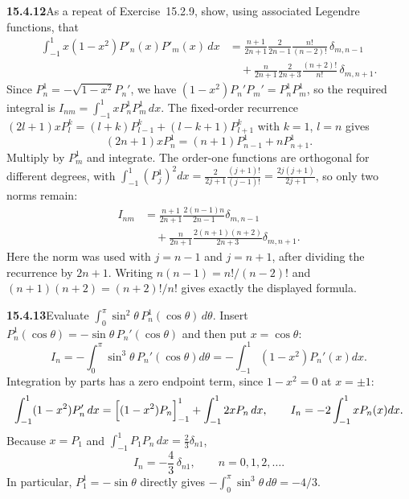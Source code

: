 \par\bigskip
\noindent\textbf{15.4.12}\quad As a repeat of Exercise~15.2.9, show,
using associated Legendre functions, that 
\begin{align*}
\int_{-1}^{1}x(1-x^{2})P'_{n}(x)P'_{m}(x)\,dx
&=\frac{n+1}{2n+1}\frac{2}{2n-1}\frac{n!}{(n-2)!}\,\delta_{m,n-1}\\
&\quad+\frac{n}{2n+1}\frac{2}{2n+3}\frac{(n+2)!}{n!}\,\delta_{m,n+1}.
\end{align*}
\solution
Since $P_n^1=-\sqrt{1-x^2}P_n'$, we have
$(1-x^2)P_n'P_m'=P_n^1P_m^1$, so the required integral is
$I_{nm}=\int_{-1}^1xP_n^1P_m^1\,dx$.
The fixed-order recurrence
$(2l+1)xP_l^k=(l+k)P_{l-1}^k+(l-k+1)P_{l+1}^k$ with $k=1$, $l=n$ gives
\[
(2n+1)xP_n^1=(n+1)P_{n-1}^1+nP_{n+1}^1.
\]
Multiply by $P_m^1$ and integrate. The order-one functions are
orthogonal for different degrees, with
$\int_{-1}^1(P_j^1)^2dx=\frac2{2j+1}\frac{(j+1)!}{(j-1)!}
=\frac{2j(j+1)}{2j+1}$, so only two norms remain:
\begin{align*}
I_{nm}
&=\frac{n+1}{2n+1}
\frac{2(n-1)n}{2n-1}\delta_{m,n-1}\\
&\quad+\frac n{2n+1}
\frac{2(n+1)(n+2)}{2n+3}\delta_{m,n+1}.
\end{align*}
Here the norm was used with $j=n-1$ and $j=n+1$, after dividing the
recurrence by $2n+1$.
Writing $n(n-1)=n!/(n-2)!$ and $(n+1)(n+2)=(n+2)!/n!$
gives exactly the displayed formula.

\par\bigskip
\noindent\textbf{15.4.13}\quad Evaluate
$\displaystyle\int_{0}^{\pi}\sin^{2}\theta\,P_{n}^{1}(\cos\theta)\,d\theta$.
\solution
Insert $P_n^1(\cos\theta)=-\sin\theta\,P_n'(\cos\theta)$ and
then put $x=\cos\theta$:
\[
I_n=-\int_0^\pi\sin^3\theta\,P_n'(\cos\theta)d\theta
=-\int_{-1}^1(1-x^2)P_n'(x)dx.
\]
Integration by parts has a zero endpoint term, since $1-x^2=0$ at
$x=\pm1$:
\[
\int_{-1}^1(1-x^2)P_n'\,dx=\Bigl[(1-x^2)P_n\Bigr]_{-1}^1
+\int_{-1}^12xP_n\,dx,\qquad
I_n=-2\int_{-1}^1xP_n(x)dx.
\]
Because $x=P_1$ and $\int_{-1}^1P_1P_n\,dx=\frac23\delta_{n1}$,
\[
\boxed{I_n=-\frac43\,\delta_{n1}},\qquad n=0,1,2,\ldots.
\]
In particular, $P_1^1=-\sin\theta$ directly gives
$-\int_0^\pi\sin^3\theta\,d\theta=-4/3$.

